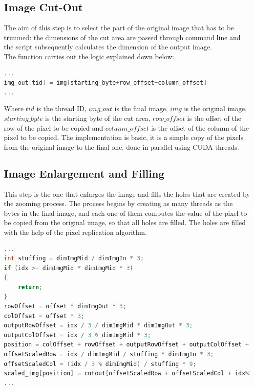    \subsection{Image Cut-Out}
    The aim of this step is to select the part of the original image that has to be trimmed: 
    the dimensions of the cut area are passed through command line and the script subsequently calculates the dimension of the output image.\\ 
    The function carries out the logic explained down below:


    \noindent\begin{lstlisting}[language=C]
...
img_out[tid] = img[starting_byte+row_offset+column_offset]
...
    \end{lstlisting}

    \noindent Where $tid$ is the thread ID, $img\_out$ is the final image, $img$ is the original image, $starting\_byte$ is the starting byte of the cut area, 
    $row\_offset$ is the offset of the row of the pixel to be copied and $column\_offset$ is the offset of the column of the pixel to be copied.
    The implementation is basic, it is a simple copy of the pixels from the original image to the final one, done in parallel using CUDA threads.\\

    \subsection{Image Enlargement and Filling}
    This step is the one that enlarges the image and fills the holes that are created by the zooming process.
    The process begins by creating as many threads as the bytes in the final image, and each one of them computes 
    the value of the pixel to be copied from the original image, so that all holes are filled.
    The holes are filled with the help of the pixel replication algorithm. 

    \small\noindent\begin{lstlisting}[language=C]
...
int stuffing = dimImgMid / dimImgIn * 3;
if (idx >= dimImgMid * dimImgMid * 3)
{
    return;
}
rowOffset = offset * dimImgOut * 3;
colOffset = offset * 3;
outputRowOffset = idx / 3 / dimImgMid * dimImgOut * 3;
outputColOffset = idx / 3 % dimImgMid * 3;
position = colOffset + rowOffset + outputRowOffset + outputColOffset + idx%3;
offsetScaledRow = idx / dimImgMid / stuffing * dimImgIn * 3;
offsetScaledCol = (idx / 3 % dimImgMid) / stuffing * 9;
scaled_img[position] = cutout[offsetScaledRow + offsetScaledCol + idx%3];
...
    \end{lstlisting}


